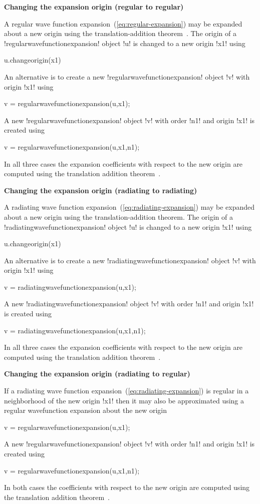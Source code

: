 \documentclass[12pt,letterpaper,final]{article}
\newcommand{\techheading}[1]{%
    \par\vspace{-0.3\parskip}\noindent\hspace{-1cm}\textbf{#1}%
    \par\vspace{-0.5\parskip}\noindent\nopagebreak\ignorespaces}
\begin{document}
\techheading{Changing the expansion origin (regular to regular)}
A regular wave function expansion~(\ref{eq:regular-expansion}) may be
expanded about a new origin using the translation-addition theorem~\cite{dufva}.
The origin of a 
!regularwavefunctionexpansion! object !u! 
is changed to a new origin !x1! using
\begin{matlab}
u.changeorigin(x1)
\end{matlab}
An alternative is to create a new !regularwavefunctionexpansion! object !v!
with origin !x1! using
\begin{matlab}
v = regularwavefunctionexpansion(u,x1);
\end{matlab}
A new !regularwavefunctionexpansion! object !v!
with order !n1! and origin !x1! is created using
\begin{matlab}
v = regularwavefunctionexpansion(u,x1,n1);
\end{matlab}
In all three cases the expansion 
coefficients with respect to the new origin are computed using
the translation addition theorem~\cite{dufva}.



 
\techheading{Changing the expansion origin (radiating to radiating)}
A radiating wave function expansion~(\ref{eq:radiating-expansion}) may be
expanded about a new origin using the translation-addition theorem.
The origin of a 
!radiatingwavefunctionexpansion! object !u! 
is changed to a new origin !x1! using
\begin{matlab}
u.changeorigin(x1)
\end{matlab}
An alternative
is to create a new !radiatingwavefunctionexpansion! object !v!
with origin !x1! using
\begin{matlab}
v = radiatingwavefunctionexpansion(u,x1);
\end{matlab}
A new !radiatingwavefunctionexpansion! object !v!
with order !n1! and origin !x1! is created using
\begin{matlab}
v = radiatingwavefunctionexpansion(u,x1,n1);
\end{matlab}
In all three cases the expansion 
coefficients with respect to the new origin are computed using
the translation addition theorem~\cite{dufva}.

\techheading{Changing the expansion origin (radiating to regular)}
If a radiating wave function expansion~(\ref{eq:radiating-expansion}) is
regular in a neighborhood of the new origin !x1! then it may also be
approximated using a regular wavefunction expansion about the new origin
\begin{matlab}
v = regularwavefunctionexpansion(u,x1);
\end{matlab}
A new !regularwavefunctionexpansion! object !v!
with order !n1! and origin !x1! is created using
\begin{matlab}
v = regularwavefunctionexpansion(u,x1,n1);
\end{matlab}
In both cases the coefficients with respect to the new origin are computed using
the translation addition theorem~\cite{dufva}.
\end{document}
